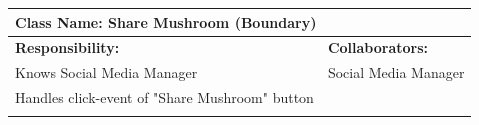 \documentclass[]{article}
\begin{document}
\begin{itemize}
        \begin{table}[ht]
		\centering
		\begin{tabular}{|p{6cm}|p{6cm}|}
		\hline 
		\multicolumn{2}{|l|}{\textbf{Class Name: Share Mushroom (Boundary)}} \\
		\hline
		\textbf{Responsibility:} & \textbf{Collaborators:} \\
		\hline
		Knows Social Media Manager & Social Media Manager\\
		Handles click-event of "Share Mushroom" button&\\
		\vspace{1in} & \\
		\hline
		\end{tabular}
	\end{table} 
	
\end{itemize}

\clearpage
\appendix
\end{document}
